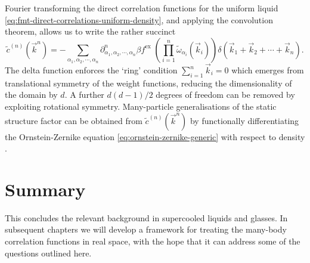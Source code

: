 \documentclass[11pt,twoside]{report}
\def\includebibliography{}
\begin{document}
Fourier transforming the direct correlation functions for the uniform liquid \eqref{eq:fmt-direct-correlations-uniform-density}, and applying the convolution theorem, allows us to write the rather succinct
\begin{equation}
  \tilde{c}^{(n)}(\vec{k}^n)
  =
  - \sum_{\alpha_1, \alpha_2, \cdots, \alpha_n}
  \partial^n_{\alpha_1, \alpha_2, \cdots, \alpha_n} \beta f^\mathrm{ex} \;
  \left( \prod_{i=1}^n \widetilde{\omega}_{\alpha_i}(\vec{k}_i) \right)
  \delta(\vec{k}_1 + \vec{k}_2 + \cdots + \vec{k}_n).
\end{equation}
The delta function enforces the `ring' condition $\sum_{i=1}^n \vec{k}_i = 0$ which emerges from translational symmetry of the weight functions, reducing the dimensionality of the domain by $d$.
A further $d(d-1)/2$ degrees of freedom%
can be removed by exploiting rotational symmetry.
Many-particle generalisations of the static structure factor can be obtained from $\tilde{c}^{(n)}(\vec{k}^n)$ by functionally differentiating the Ornstein-Zernike equation \eqref{eq:ornstein-zernike-generic} with respect to density \cite{BarratMP1988}.

\section{Summary}

This concludes the relevant background in supercooled liquids and glasses.
In subsequent chapters we will develop a framework for treating the many-body correlation functions in real space, with the hope that it can address some of the questions outlined here.

\ifdefined\includebibliography
  \printbibliography
\fi
\end{document}
